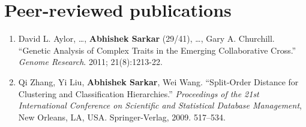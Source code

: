 \documentclass{article}
\begin{document}
\section*{Peer-reviewed publications}
\begin{enumerate}[labelindent=-2.45em, itemindent=0pt, leftmargin=!]
\item David L. Aylor, \ldots, \textbf{Abhishek Sarkar} (29/41), \ldots, Gary A.
  Churchill. ``Genetic Analysis of Complex Traits in the Emerging Collaborative
  Cross.'' \emph{Genome Research}. 2011; 21(8):1213-22.

\item Qi Zhang, Yi Liu, \textbf{Abhishek Sarkar}, Wei Wang. ``Split-Order
  Distance for Clustering and Classification Hierarchies.'' \emph{Proceedings
    of the 21st International Conference on Scientific and Statistical Database
    Management}, New Orleans, LA, USA. Springer-Verlag, 2009. 517–534.
\end{enumerate}
\end{document}
